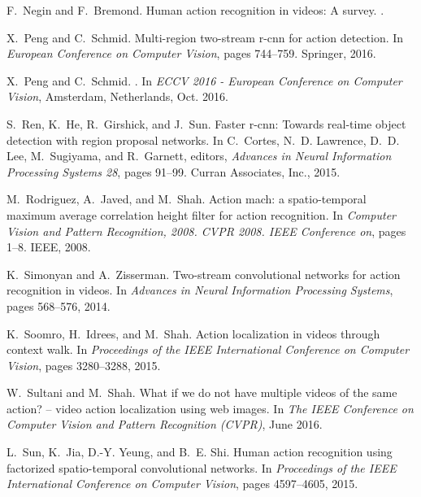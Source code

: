 \documentclass[10pt,twocolumn,letterpaper]{article}
\begin{document}
{\begin{thebibliography}{10}
F.~Negin and F.~Bremond.
\newblock Human action recognition in videos: A survey.
.

X.~Peng and C.~Schmid.
\newblock Multi-region two-stream r-cnn for action detection.
\newblock In {\em European Conference on Computer Vision}, pages 744--759.
  Springer, 2016.

X.~Peng and C.~Schmid.
.
\newblock In {\em {ECCV 2016 - European Conference on Computer Vision}},
  Amsterdam, Netherlands, Oct. 2016.

S.~Ren, K.~He, R.~Girshick, and J.~Sun.
\newblock Faster r-cnn: Towards real-time object detection with region proposal
  networks.
\newblock In C.~Cortes, N.~D. Lawrence, D.~D. Lee, M.~Sugiyama, and R.~Garnett,
  editors, {\em Advances in Neural Information Processing Systems 28}, pages
  91--99. Curran Associates, Inc., 2015.

M.~Rodriguez, A.~Javed, and M.~Shah.
\newblock Action mach: a spatio-temporal maximum average correlation height
  filter for action recognition.
\newblock In {\em Computer Vision and Pattern Recognition, 2008. CVPR 2008.
  IEEE Conference on}, pages 1--8. IEEE, 2008.

K.~Simonyan and A.~Zisserman.
\newblock Two-stream convolutional networks for action recognition in videos.
\newblock In {\em Advances in Neural Information Processing Systems}, pages
  568--576, 2014.

K.~Soomro, H.~Idrees, and M.~Shah.
\newblock Action localization in videos through context walk.
\newblock In {\em Proceedings of the IEEE International Conference on Computer
  Vision}, pages 3280--3288, 2015.

W.~Sultani and M.~Shah.
\newblock What if we do not have multiple videos of the same action? -- video
  action localization using web images.
\newblock In {\em The IEEE Conference on Computer Vision and Pattern
  Recognition (CVPR)}, June 2016.

L.~Sun, K.~Jia, D.-Y. Yeung, and B.~E. Shi.
\newblock Human action recognition using factorized spatio-temporal
  convolutional networks.
\newblock In {\em Proceedings of the IEEE International Conference on Computer
  Vision}, pages 4597--4605, 2015.


\end{thebibliography}}
\end{document}
